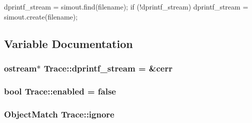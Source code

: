 \begin{DoxyCode}
{
    dprintf_stream = simout.find(filename);
    if (!dprintf_stream)
        dprintf_stream = simout.create(filename);
}
\end{DoxyCode}


\subsection{Variable Documentation}
\hypertarget{namespaceTrace_a58559cb033c06f1aa031c3c3da03c324}{
\subsubsection[{dprintf\_\-stream}]{\setlength{\rightskip}{0pt plus 5cm}ostream$\ast$ {\bf Trace::dprintf\_\-stream} = \&cerr}}
\label{namespaceTrace_a58559cb033c06f1aa031c3c3da03c324}
\hypertarget{namespaceTrace_a7eceed02e84cba66f80ba6e5fc184ebc}{
\subsubsection[{enabled}]{\setlength{\rightskip}{0pt plus 5cm}bool {\bf Trace::enabled} = false}}
\label{namespaceTrace_a7eceed02e84cba66f80ba6e5fc184ebc}
\hypertarget{namespaceTrace_a58099233c1194638eed4e30f4adfed73}{
\subsubsection[{ignore}]{\setlength{\rightskip}{0pt plus 5cm}ObjectMatch {\bf Trace::ignore}}}
\label{namespaceTrace_a58099233c1194638eed4e30f4adfed73}
